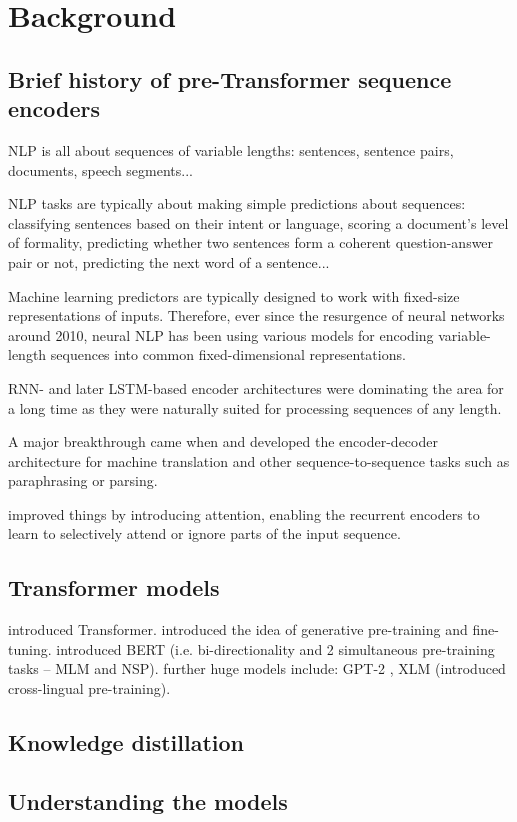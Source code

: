 \documentclass[bsc,frontabs,twoside,singlespacing,parskip,deptreport]{infthesis}
\begin{document}
\chapter{Background}{
  \section{Brief history of pre-Transformer sequence encoders}{
    NLP is all about sequences of variable lengths: sentences, sentence pairs, documents, speech segments...

    NLP tasks are typically about making simple predictions about sequences: classifying sentences based on their intent or language, scoring a document's level of formality, predicting whether two sentences form a coherent question-answer pair or not, predicting the next word of a sentence...

    Machine learning predictors are typically designed to work with fixed-size representations of inputs. Therefore, ever since the resurgence of neural networks around 2010, neural NLP has been using various models for encoding variable-length sequences into common fixed-dimensional representations.

    RNN- and later LSTM-based encoder architectures were dominating the area for a long time as they were naturally suited for processing sequences of any length.

    A major breakthrough came when \citet{Kalchbrenner_2013} and \citet{Sutskever_2014} developed the encoder-decoder architecture for machine translation and other sequence-to-sequence tasks such as paraphrasing or parsing.

    \citet{Bahdanau_2014} improved things by introducing attention, enabling the recurrent encoders to learn to selectively attend or ignore parts of the input sequence.
  }
  \section{Transformer models}{
    \citet{Vaswani_2017} introduced Transformer.
    \citet{Radford_2018} introduced the idea of generative pre-training and fine-tuning.
    \citet{Devlin_2018} introduced BERT (i.e. bi-directionality and 2 simultaneous pre-training tasks -- MLM and NSP).
    further huge models include: GPT-2 \citep{Radford_2019}, XLM \citep{Lample_2019} (introduced cross-lingual pre-training).
  }
  \section{Knowledge distillation}{}
  \section{Understanding the models}{}
}
\end{document}
